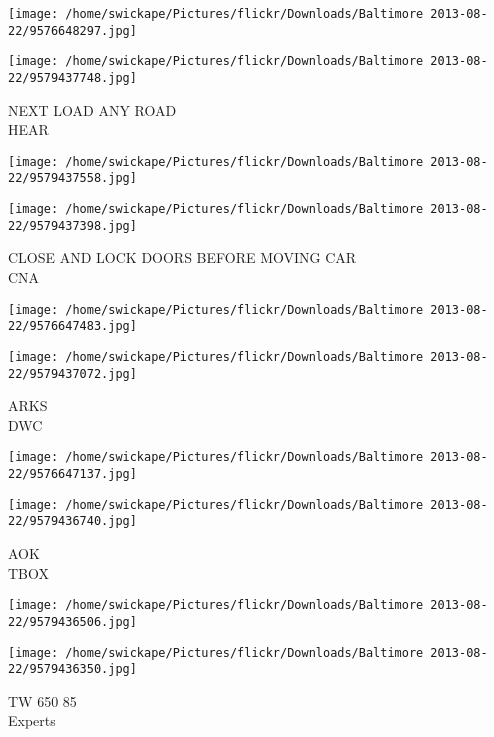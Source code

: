 \documentclass[10pt,letterpaper]{article}
\begin{document}
\texttt{[image: /home/swickape/Pictures/flickr/Downloads/Baltimore 2013-08-22/9576648297.jpg]}

\vspace{0.25in}
\texttt{[image: /home/swickape/Pictures/flickr/Downloads/Baltimore 2013-08-22/9579437748.jpg]}

NEXT LOAD ANY ROAD\\
HEAR\\
\pagebreak

\texttt{[image: /home/swickape/Pictures/flickr/Downloads/Baltimore 2013-08-22/9579437558.jpg]}

\vspace{0.25in}
\texttt{[image: /home/swickape/Pictures/flickr/Downloads/Baltimore 2013-08-22/9579437398.jpg]}

CLOSE AND LOCK DOORS BEFORE MOVING CAR\\
CNA\\
\pagebreak

\texttt{[image: /home/swickape/Pictures/flickr/Downloads/Baltimore 2013-08-22/9576647483.jpg]}

\vspace{0.25in}
\texttt{[image: /home/swickape/Pictures/flickr/Downloads/Baltimore 2013-08-22/9579437072.jpg]}

ARKS\\
DWC\\
\pagebreak

\texttt{[image: /home/swickape/Pictures/flickr/Downloads/Baltimore 2013-08-22/9576647137.jpg]}

\vspace{0.25in}
\texttt{[image: /home/swickape/Pictures/flickr/Downloads/Baltimore 2013-08-22/9579436740.jpg]}

AOK\\
TBOX\\
\pagebreak

\texttt{[image: /home/swickape/Pictures/flickr/Downloads/Baltimore 2013-08-22/9579436506.jpg]}

\vspace{0.25in}
\texttt{[image: /home/swickape/Pictures/flickr/Downloads/Baltimore 2013-08-22/9579436350.jpg]}

TW 650 85\\
Experts\\
\pagebreak
\end{document}
